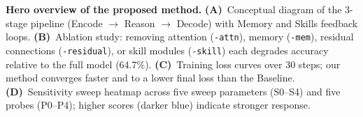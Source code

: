 \caption{\textbf{Hero overview of the proposed method.}
\textbf{(A)}~Conceptual diagram of the 3-stage pipeline (Encode $\to$ Reason $\to$ Decode) with Memory and Skills feedback loops.
\textbf{(B)}~Ablation study: removing attention (\texttt{-attn}), memory (\texttt{-mem}), residual connections (\texttt{-residual}), or skill modules (\texttt{-skill}) each degrades accuracy relative to the full model (64.7\%).
\textbf{(C)}~Training loss curves over 30 steps; our method converges faster and to a lower final loss than the Baseline.
\textbf{(D)}~Sensitivity sweep heatmap across five sweep parameters (S0--S4) and five probes (P0--P4); higher scores (darker blue) indicate stronger response.}
